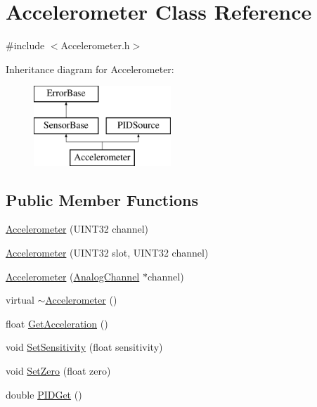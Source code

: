 \hypertarget{classAccelerometer}{\section{\-Accelerometer \-Class \-Reference}
\label{classAccelerometer}
}


{\ttfamily \#include $<$\-Accelerometer.\-h$>$}

\-Inheritance diagram for \-Accelerometer\-:\begin{figure}[H]
\begin{center}
\leavevmode
\includegraphics[height=3.000000cm]{classAccelerometer}
\end{center}
\end{figure}
\subsection*{\-Public \-Member \-Functions}
\begin{DoxyCompactItemize}
\item 
\hyperlink{classAccelerometer_a39b9a1d97af754f9e65d38e20fc7d4c6}{\-Accelerometer} (\-U\-I\-N\-T32 channel)
\item 
\hyperlink{classAccelerometer_ae32050fd113426ff203ce5ce83e09d4b}{\-Accelerometer} (\-U\-I\-N\-T32 slot, \-U\-I\-N\-T32 channel)
\item 
\hyperlink{classAccelerometer_a69cce3af6adfffca56d41dd4ff6c3a3a}{\-Accelerometer} (\hyperlink{classAnalogChannel}{\-Analog\-Channel} $\ast$channel)
\item 
virtual \hyperlink{classAccelerometer_acb6a7d9c61f2084ec4aec4a8ff35d622}{$\sim$\-Accelerometer} ()
\item 
float \hyperlink{classAccelerometer_a9a898749542f5338504895fc4debbf95}{\-Get\-Acceleration} ()
\item 
void \hyperlink{classAccelerometer_ad34599b5f2dbd1cd62de2c05b4d8e430}{\-Set\-Sensitivity} (float sensitivity)
\item 
void \hyperlink{classAccelerometer_aa769546f0fd9e93a25e8f696102ff8dd}{\-Set\-Zero} (float zero)
\item 
double \hyperlink{classAccelerometer_a4842f8338d2bb3922d8d8d793584d626}{\-P\-I\-D\-Get} ()
\end{DoxyCompactItemize}


